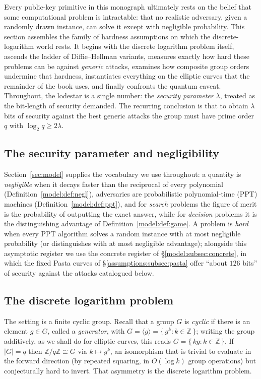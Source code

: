 \documentclass[11pt,a4paper]{article}
\theoremstyle{definition}
\theoremstyle{remark}
\newcommand{\Z}{\ensuremath{\mathbb{Z}}}
\begin{document}
Every public-key primitive in this monograph ultimately rests on the belief that some computational problem is intractable: that no realistic adversary, given a randomly drawn instance, can solve it except with negligible probability. This section assembles the family of hardness assumptions on which the discrete-logarithm world rests. It begins with the discrete logarithm problem itself, ascends the ladder of Diffie--Hellman variants, measures exactly how hard these problems can be against \emph{generic} attacks, examines how composite group orders undermine that hardness, instantiates everything on the elliptic curves that the remainder of the book uses, and finally confronts the quantum caveat. Throughout, the lodestar is a single number: the \emph{security parameter} \(\lambda\), treated as the bit-length of security demanded. The recurring conclusion is that to obtain \(\lambda\) bits of security against the best generic attacks the group must have prime order \(q\) with \(\log_2 q \ge 2\lambda\).

\subsection{The security parameter and negligibility}
\label{assumptions:subsec:setup}

Section~\ref{sec:model} supplies the vocabulary we use throughout: a quantity is \emph{negligible} when it decays faster than the reciprocal of every polynomial (Definition~\ref{model:def:negl}), adversaries are probabilistic polynomial-time (PPT) machines (Definition~\ref{model:def:ppt}), and for \emph{search} problems the figure of merit is the probability of outputting the exact answer, while for \emph{decision} problems it is the distinguishing advantage of Definition~\ref{model:def:game}. A problem is \emph{hard} when every PPT algorithm solves a random instance with at most negligible probability (or distinguishes with at most negligible advantage); alongside this asymptotic register we use the concrete register of \S\ref{model:subsec:concrete}, in which the fixed Pasta curves of \S\ref{assumptions:subsec:pasta} offer ``about \(126\) bits'' of security against the attacks catalogued below.

\subsection{The discrete logarithm problem}
\label{assumptions:subsec:dlp}

The setting is a finite cyclic group. Recall that a group \(G\) is \emph{cyclic} if there is an element \(g \in G\), called a \emph{generator}, with \(G = \langle g \rangle = \{\, g^k : k \in \Z \,\}\); writing the group additively, as we shall do for elliptic curves, this reads \(G = \{\, kg : k \in \Z\,\}\). If \(|G| = q\) then \(\Z/q\Z \cong G\) via \(k \mapsto g^k\), an isomorphism that is trivial to evaluate in the forward direction (by repeated squaring, in \(O(\log k)\) group operations) but conjecturally hard to invert. That asymmetry is the discrete logarithm problem.
\end{document}
